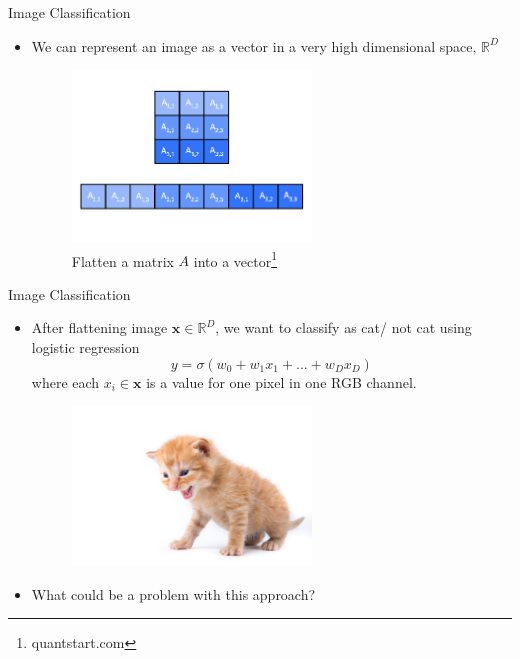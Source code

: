 \begin{frame}{Image Classification}
\begin{itemize}
    \item We can represent an image as a vector in a very high dimensional space, $\mathbb{R}^D$
    \begin{figure}
    \centering
    \includegraphics[width=0.6\textwidth]{img/flatten.png}
    
    \caption{Flatten a matrix $A$ into a vector\footnote{quantstart.com}}
    \end{figure}
\end{itemize}

\end{frame}

\begin{frame}{Image Classification}
\begin{itemize}
    \item After flattening image $\textbf{x} \in \mathbb{R}^D$, we want to classify as cat/ not cat using logistic regression
    $$y = \sigma(w_0 + w_1x_1 + ... + w_Dx_D)$$
    where each $x_i \in \textbf{x}$ is a value for one pixel in one RGB channel.
    \begin{figure}
    \centering
    \includegraphics[width=0.6\textwidth]{img/cat.jpg}
    \end{figure}
    \item What could be a problem with this approach?
\end{itemize}
\end{frame}

